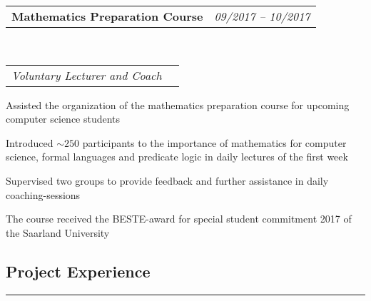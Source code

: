 \documentclass[10pt,letterpaper]{article}
\makeatletter
\newcommand{\headerrow}[2]
{\begin{tabular*}{\linewidth}{l@{\extracolsep{\fill}}r}
	#1 &
	#2 \\
\end{tabular*}}
\makeatother
\begin{document}

\noindent
\headerrow{\textbf{Mathematics Preparation Course}}{\emph{09/2017 -- 10/2017}}
\\ 
\headerrow{\emph{Voluntary Lecturer and Coach}}{}
\vspace{-1.6em}
\begin{itemize*}
    \item Assisted the organization of the mathematics preparation course for upcoming computer science students%
    \item Introduced $\sim 250$ participants to the importance of mathematics for computer science, formal languages and predicate logic in daily lectures of the first week
    \item Supervised two groups to provide feedback and further assistance in daily coaching-sessions
    \item The course received the BESTE-award for special student commitment 2017 of the Saarland University
\end{itemize*}

% 


\subsection*{Project Experience}
\hrule
\vspace{0.4em}
\end{document}
